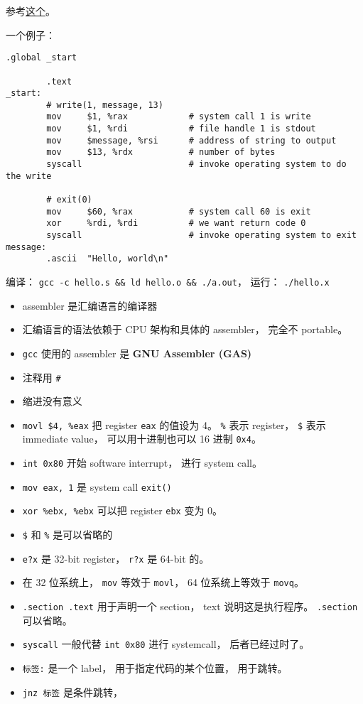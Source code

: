 
\begin{issues}
\issueDraft
\end{issues}

参考\href{https://cs.lmu.edu/~ray/notes/gasexamples/}{这个}。

一个例子：
\begin{lstlisting}[language=none]
        .global _start

        .text
_start:
        # write(1, message, 13)
        mov     $1, %rax            # system call 1 is write
        mov     $1, %rdi            # file handle 1 is stdout
        mov     $message, %rsi      # address of string to output
        mov     $13, %rdx           # number of bytes
        syscall                     # invoke operating system to do the write

        # exit(0)
        mov     $60, %rax           # system call 60 is exit
        xor     %rdi, %rdi          # we want return code 0
        syscall                     # invoke operating system to exit
message:
        .ascii  "Hello, world\n"
\end{lstlisting}

编译： \verb|gcc -c hello.s && ld hello.o && ./a.out|， 运行： \verb|./hello.x|

\begin{itemize}
\item assembler 是汇编语言的编译器
\item 汇编语言的语法依赖于 CPU 架构和具体的 assembler， 完全不 portable。
\item \verb|gcc| 使用的 assembler 是 \textbf{GNU Assembler (GAS)}
\item 注释用 \verb|#|
\item 缩进没有意义
\item \verb|movl $4, %eax| 把 register \verb|eax| 的值设为 4。 \verb|%| 表示 register， \verb|$| 表示 immediate value， 可以用十进制也可以 16 进制 \verb|0x4|。
\item \verb|int 0x80| 开始 software interrupt， 进行 system call。
\item \verb|mov eax, 1| 是 system call \verb|exit()|
\item \verb|xor %ebx, %ebx| 可以把 register \verb|ebx| 变为 0。
\item \verb|$| 和 \verb|%| 是可以省略的
\item \verb|e?x| 是 32-bit register， \verb|r?x| 是 64-bit 的。
\item 在 32 位系统上， \verb|mov| 等效于 \verb|movl|， 64 位系统上等效于 \verb|movq|。
\item \verb|.section .text| 用于声明一个 section， text 说明这是执行程序。 \verb|.section| 可以省略。
\item \verb|syscall| 一般代替 \verb|int 0x80| 进行 systemcall， 后者已经过时了。
\item \verb|标签:| 是一个 label， 用于指定代码的某个位置， 用于跳转。
\item \verb|jnz 标签| 是条件跳转， 
\end{itemize}


